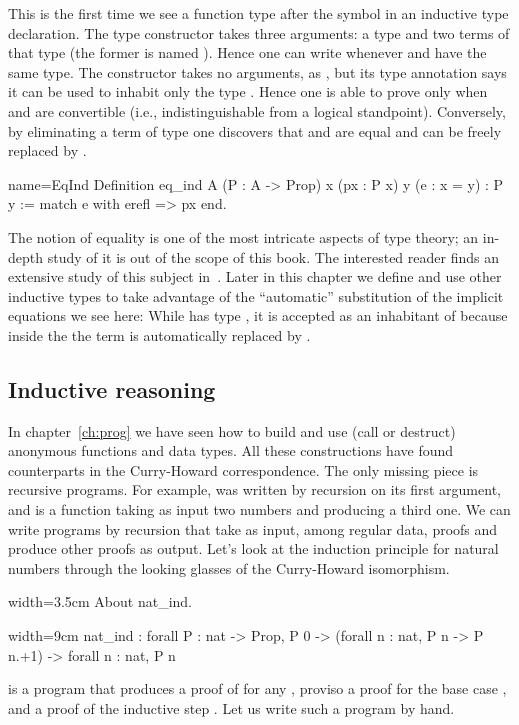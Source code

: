 This is the first time we see a function type after the \C{:} symbol
in an inductive type declaration.
The  type constructor takes three arguments: a type  and
two terms of that type (the former is named ).
Hence one can write  whenever  and 
have the same type.
The  constructor takes no arguments, as , but its type
annotation says it can be used to inhabit only the type .
Hence one is able to prove  only when  and  are
convertible
(i.e., indistinguishable from a logical standpoint).
Conversely, by eliminating a term
of type  one discovers that   and  are
equal and  can be freely replaced by .

\begin{coq}{name=EqInd}{}
Definition eq_ind A (P : A -> Prop) x (px : P x) y (e : x = y) : P y :=
  match e with erefl => px end.
\end{coq}

The notion of equality is one of the most intricate aspects of type
theory; an in-depth study of it is out of the scope of this book.  The interested reader
finds an extensive study of this subject in~\cite{hottbook}.  Later in this
chapter we define and use other inductive types to take advantage
of the ``automatic'' substitution of the implicit equations we see here:
While  has type , it is accepted as an
inhabitant of  because inside the  the term 
is automatically replaced by .


\subsection{Inductive reasoning}\label{ssec:indreason}

In chapter~\ref{ch:prog} we have seen how to build and use (call or destruct)
anonymous functions and data types.  All these
constructions have found counterparts in the Curry-Howard correspondence.
The only missing piece is recursive programs.  For example,
 was written by recursion on its first argument, and is a
function taking as input two numbers and producing a third one.
We can write programs by recursion that take as input, among regular  data,
proofs and produce  other proofs as output.  Let's look at the
induction principle for natural numbers through the looking glasses of the
Curry-Howard isomorphism.

\begin{coq}{}{width=3.5cm}
About nat_ind.
\end{coq}
\begin{coqout}{}{width=9cm}
nat_ind : forall P : nat -> Prop,
  P 0 -> (forall n : nat, P n -> P n.+1) -> forall n : nat, P n
\end{coqout}
 is a program that produces a proof of  for any ,
proviso a proof for the base case , and a proof
of the inductive step .
Let us write such a program by hand.

